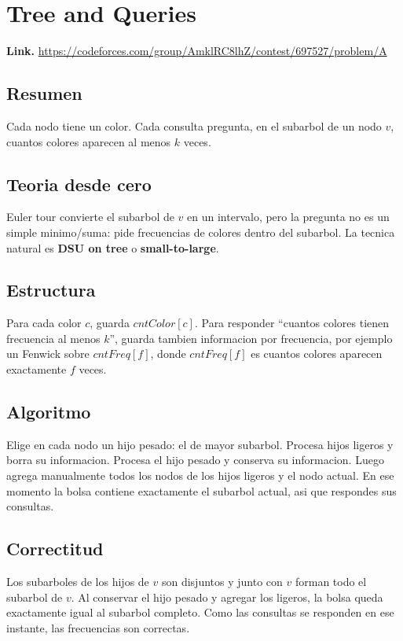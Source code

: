 \documentclass[10pt]{article}
\begin{document}
\clearpage
\section{Tree and Queries}
\textbf{Link.} \url{https://codeforces.com/group/AmklRC8lhZ/contest/697527/problem/A}

\subsection*{Resumen}
Cada nodo tiene un color. Cada consulta pregunta, en el subarbol de un nodo
$v$, cuantos colores aparecen al menos $k$ veces.

\subsection*{Teoria desde cero}
Euler tour convierte el subarbol de $v$ en un intervalo, pero la pregunta no es
un simple minimo/suma: pide frecuencias de colores dentro del subarbol. La
tecnica natural es \textbf{DSU on tree} o \textbf{small-to-large}.

\subsection*{Estructura}
Para cada color $c$, guarda $cntColor[c]$. Para responder ``cuantos colores
tienen frecuencia al menos $k$'', guarda tambien informacion por frecuencia,
por ejemplo un Fenwick sobre $cntFreq[f]$, donde $cntFreq[f]$ es cuantos colores
aparecen exactamente $f$ veces.

\subsection*{Algoritmo}
Elige en cada nodo un hijo pesado: el de mayor subarbol. Procesa hijos ligeros y
borra su informacion. Procesa el hijo pesado y conserva su informacion. Luego
agrega manualmente todos los nodos de los hijos ligeros y el nodo actual. En ese
momento la bolsa contiene exactamente el subarbol actual, asi que respondes sus
consultas.

\subsection*{Correctitud}
Los subarboles de los hijos de $v$ son disjuntos y junto con $v$ forman todo el
subarbol de $v$. Al conservar el hijo pesado y agregar los ligeros, la bolsa
queda exactamente igual al subarbol completo. Como las consultas se responden en
ese instante, las frecuencias son correctas.
\end{document}
